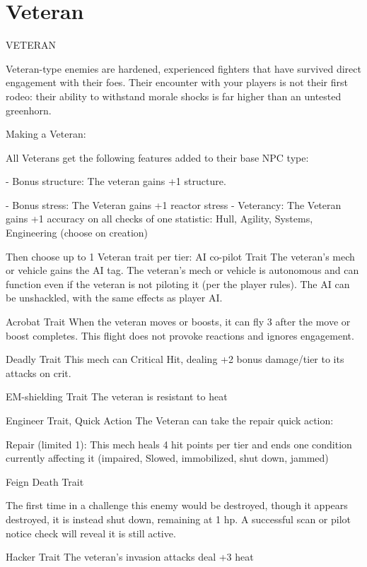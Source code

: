 \section{Veteran}
                                                   VETERAN

Veteran-type enemies are hardened, experienced fighters that have survived direct engagement
with their foes. Their encounter with your players is not their first rodeo: their ability to withstand
morale shocks is far higher than an untested greenhorn.


Making a Veteran:

All Veterans get the following features added to their base NPC type:

     -   Bonus structure: The veteran gains +1 structure.

     -   Bonus stress: The Veteran gains +1 reactor stress
     -   Veterancy: The Veteran gains +1 accuracy on all checks of one statistic: Hull, Agility,
         Systems, Engineering (choose on creation)

Then choose up to 1 Veteran trait per tier:
AI co-pilot
Trait
The veteran’s mech or vehicle gains the AI tag. The veteran’s mech or vehicle is autonomous and
can function even if the veteran is not piloting it (per the player rules). The AI can be unshackled,
with the same effects as player AI.


Acrobat
Trait
When the veteran moves or boosts, it can fly 3 after the move or boost completes. This flight
does not provoke reactions and ignores engagement.


Deadly
Trait
This mech can Critical Hit, dealing +2 bonus damage/tier to its attacks on crit.


EM-shielding
Trait
The veteran is resistant to heat


Engineer
Trait, Quick Action
The Veteran can take the repair quick action:

         Repair (limited 1): This mech heals 4 hit points per tier and ends one condition currently
         affecting it (impaired, Slowed, immobilized, shut down, jammed)


Feign Death
Trait




The first time in a challenge this enemy would be destroyed, though it appears destroyed, it is
instead shut down, remaining at 1 hp. A successful scan or pilot notice check will reveal it is still
active.


Hacker
Trait
The veteran’s invasion attacks deal +3 heat


